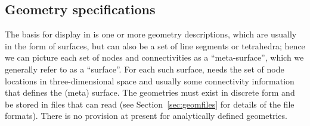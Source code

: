 \subsection{Geometry specifications}
\label{sec:usage-geometry} 


The basis for display in \map{} is one or more geometry descriptions,
which are usually in the form of surfaces, but can also be a set of line
segments or tetrahedra; hence we can picture each set of nodes and
connectivities as a ``meta-surface'', which we generally refer to as a
``surface''.  For each such surface, \map{} needs the set of node locations
in three-dimensional space and usually some connectivity information that
defines the (meta) surface.  The geometries must exist in discrete form and
be stored in files that \map{} can read (see Section~\ref{sec:geomfiles} for
details of the file formats).  There is no provision at present for
analytically defined geometries.

